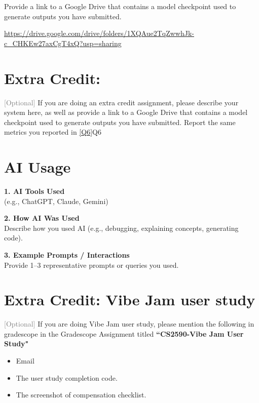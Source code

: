 \documentclass{article}
\begin{document}
Provide a link to a Google Drive that contains a model checkpoint
used to generate outputs you have submitted.

\url{https://drive.google.com/drive/folders/1XQAue2TqZwwhJk-c_CHKEw27axCgT4xQ?usp=sharing}

\section*{Extra Credit: }
\textcolor{gray}{[Optional]}
If you are doing an extra credit assignment, please describe your
system here, as well as provide a link to a Google Drive that
contains a model checkpoint used to generate outputs you have
submitted. Report the same metrics you reported in \ref{Q6}Q6

\section*{AI Usage}

\noindent\textbf{1. AI Tools Used} \\
(e.g., ChatGPT, Claude, Gemini) \\
\hrulefill

\noindent\textbf{2. How AI Was Used} \\
Describe how you used AI (e.g., debugging, explaining concepts,
generating code). \\
\hrulefill

\noindent\textbf{3. Example Prompts / Interactions} \\
Provide 1--3 representative prompts or queries you used. \\
\hrulefill

\section*{Extra Credit: Vibe Jam user study}
\textcolor{gray}{[Optional]}
If you are doing Vibe Jam user study, please mention the following in
gradescope in the Gradescope Assignment titled \textbf{``CS2590-Vibe
Jam User Study"}
\begin{itemize}
  \item Email
  \item The user study completion code.
  \item The screenshot of compensation checklist.
\end{itemize}
\end{document}
